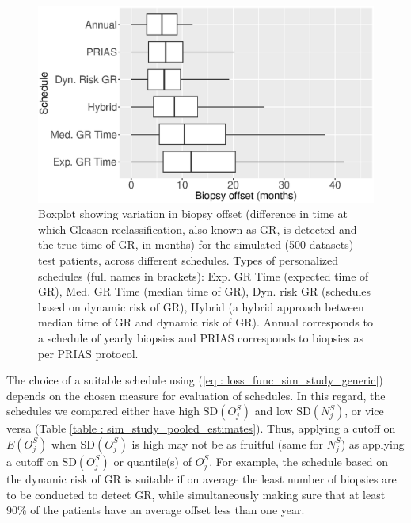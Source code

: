 \begin{figure}[!htb]
\centerline{\includegraphics[width=\columnwidth]{offsetBoxPlot_all.eps}}
\caption{Boxplot showing variation in biopsy offset (difference in time at which Gleason reclassification, also known as GR, is detected and the true time of GR, in months) for the simulated (500 datasets) test patients, across different schedules. Types of personalized schedules (full names in brackets): Exp. GR Time (expected time of GR), Med. GR Time (median time of GR), Dyn. risk GR (schedules based on dynamic risk of GR), Hybrid (a hybrid approach between median time of GR and dynamic risk of GR). Annual corresponds to a schedule of yearly biopsies and PRIAS corresponds to biopsies as per PRIAS protocol.}
\label{fig : offsetBoxPlot_all}
\end{figure}

The choice of a suitable schedule using (\ref{eq : loss_func_sim_study_generic}) depends on the chosen measure for evaluation of schedules. In this regard, the schedules we compared either have high $\mbox{SD}(O^S_j)$ and low $\mbox{SD}(N^S_j)$, or vice versa (Table \ref{table : sim_study_pooled_estimates}). Thus, applying a cutoff on $E(O^S_j)$ when $\mbox{SD}(O^S_j)$ is high may not be as fruitful (same for $N^S_j$) as applying a cutoff on $\mbox{SD}(O^S_j)$ or quantile(s) of $O^S_j$. For example, the schedule based on the dynamic risk of GR is suitable if on average the least number of biopsies are to be conducted to detect GR, while simultaneously making sure that at least 90\% of the patients have an average offset less than one year.

